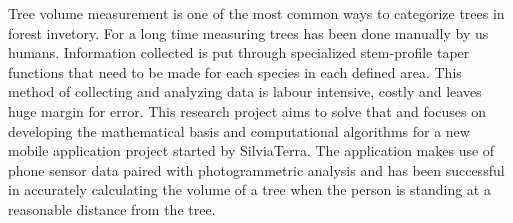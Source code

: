 Tree volume measurement is one of the most common ways to categorize trees in forest invetory. For a long time measuring trees has been done manually by us humans. Information collected is put through specialized stem-profile taper functions that need to be made for each species in each defined area. This method of collecting and analyzing data is labour intensive, costly and leaves huge margin for error. This research project aims to solve that and focuses on developing the mathematical basis and computational algorithms for a new mobile application project started by SilviaTerra. The application makes use of phone sensor data paired with photogrammetric analysis and has been successful in accurately calculating the volume of a tree when the person is standing at a reasonable distance from the tree.